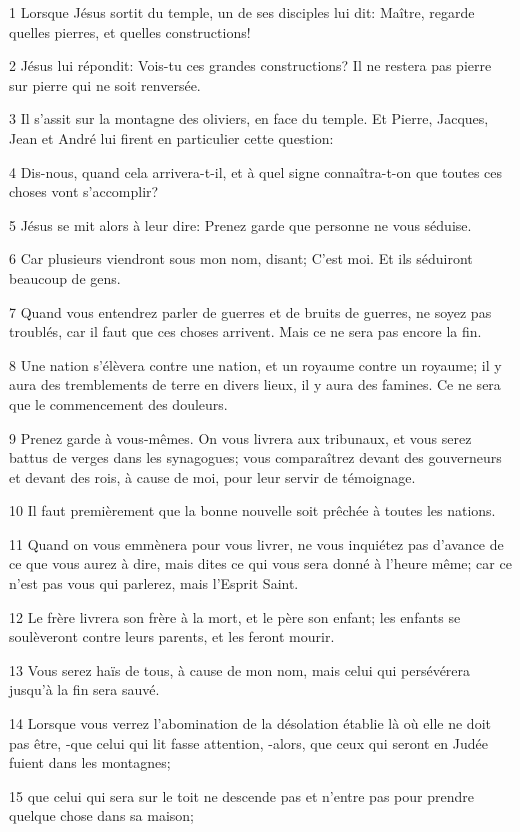 \par 1 Lorsque Jésus sortit du temple, un de ses disciples lui dit: Maître, regarde quelles pierres, et quelles constructions!
\par 2 Jésus lui répondit: Vois-tu ces grandes constructions? Il ne restera pas pierre sur pierre qui ne soit renversée.
\par 3 Il s'assit sur la montagne des oliviers, en face du temple. Et Pierre, Jacques, Jean et André lui firent en particulier cette question:
\par 4 Dis-nous, quand cela arrivera-t-il, et à quel signe connaîtra-t-on que toutes ces choses vont s'accomplir?
\par 5 Jésus se mit alors à leur dire: Prenez garde que personne ne vous séduise.
\par 6 Car plusieurs viendront sous mon nom, disant; C'est moi. Et ils séduiront beaucoup de gens.
\par 7 Quand vous entendrez parler de guerres et de bruits de guerres, ne soyez pas troublés, car il faut que ces choses arrivent. Mais ce ne sera pas encore la fin.
\par 8 Une nation s'élèvera contre une nation, et un royaume contre un royaume; il y aura des tremblements de terre en divers lieux, il y aura des famines. Ce ne sera que le commencement des douleurs.
\par 9 Prenez garde à vous-mêmes. On vous livrera aux tribunaux, et vous serez battus de verges dans les synagogues; vous comparaîtrez devant des gouverneurs et devant des rois, à cause de moi, pour leur servir de témoignage.
\par 10 Il faut premièrement que la bonne nouvelle soit prêchée à toutes les nations.
\par 11 Quand on vous emmènera pour vous livrer, ne vous inquiétez pas d'avance de ce que vous aurez à dire, mais dites ce qui vous sera donné à l'heure même; car ce n'est pas vous qui parlerez, mais l'Esprit Saint.
\par 12 Le frère livrera son frère à la mort, et le père son enfant; les enfants se soulèveront contre leurs parents, et les feront mourir.
\par 13 Vous serez haïs de tous, à cause de mon nom, mais celui qui persévérera jusqu'à la fin sera sauvé.
\par 14 Lorsque vous verrez l'abomination de la désolation établie là où elle ne doit pas être, -que celui qui lit fasse attention, -alors, que ceux qui seront en Judée fuient dans les montagnes;
\par 15 que celui qui sera sur le toit ne descende pas et n'entre pas pour prendre quelque chose dans sa maison;
